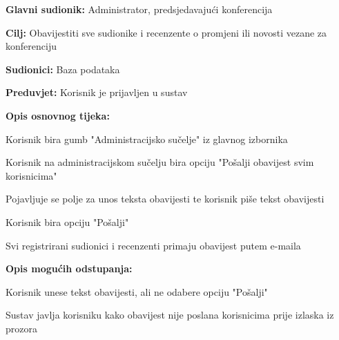 \begin{packed_item}
					\end{packed_item}

					\noindent {}
					\begin{packed_item}
						\item \textbf{Glavni sudionik:} Administrator, predsjedavajući konferencija
						\item \textbf{Cilj:} Obavijestiti sve sudionike i recenzente o promjeni ili novosti vezane za konferenciju
						\item \textbf{Sudionici:} Baza podataka
						\item \textbf{Preduvjet:} Korisnik je prijavljen u sustav
						
						\item \textbf{Opis osnovnog tijeka:} 
						\item[] \begin{packed_enum}
							\item Korisnik bira gumb "Administracijsko sučelje" iz glavnog izbornika
							\item Korisnik na administracijskom sučelju bira opciju "Pošalji obavijest svim korisnicima"
							\item Pojavljuje se polje za unos teksta obavijesti te korisnik piše tekst obavijesti
							\item Korisnik bira opciju "Pošalji"
							\item Svi registrirani sudionici i recenzenti primaju obavijest putem e-maila
						\end{packed_enum}
					
						\item \textbf{Opis mogućih odstupanja:}
						\item[] \begin{packed_enum}

							\item[2.a] Korisnik unese tekst obavijesti, ali ne odabere opciju "Pošalji"
							\item[] \begin{packed_enum}
								\item[1.] Sustav javlja korisniku kako obavijest nije poslana korisnicima prije izlaska iz prozora
							\end{packed_enum}
							
						\end{packed_enum}
					\end{packed_item}


